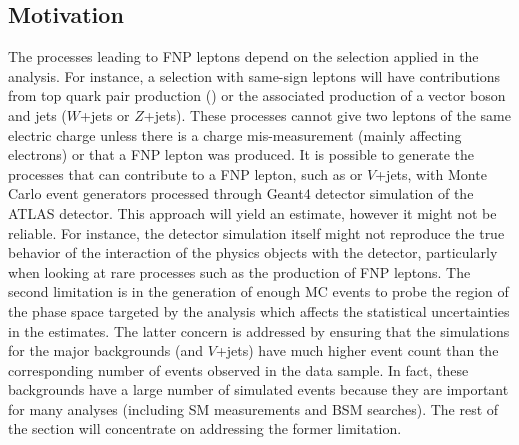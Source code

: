 \subsection{Motivation}
\label{sec:fake.mct}
The processes leading to FNP leptons depend on the selection applied in the analysis. For instance, a selection with same-sign leptons 
will have contributions from top quark pair production (\ttbar) or the associated production of a vector boson and jets 
($W$+jets or $Z$+jets).%
 These processes cannot give two leptons of the same electric charge unless there is a charge mis-measurement (mainly affecting electrons) 
or that a FNP lepton was produced. It is possible to generate the processes that can contribute to a FNP lepton, such as \ttbar or 
$V$+jets, with Monte Carlo event generators processed through Geant4 detector simulation of the ATLAS detector.  
This approach will yield an estimate, however it might not be reliable. For instance, the detector simulation itself might not 
reproduce the true behavior of the interaction of the physics objects with the detector, particularly when looking at rare processes 
such as the production of FNP leptons. The second limitation is in the generation of enough MC events to probe the region of the 
phase space targeted by the analysis which affects the statistical uncertainties in the estimates.
The latter concern is addressed by ensuring that the simulations for the major backgrounds (\ttbar and $V$+jets) have much 
higher event count than the corresponding number of events observed in the data sample.
In fact, these backgrounds have a large number of simulated events because they are important for many analyses 
(including SM measurements and BSM searches).
The rest of the section will concentrate on addressing the former limitation. 



